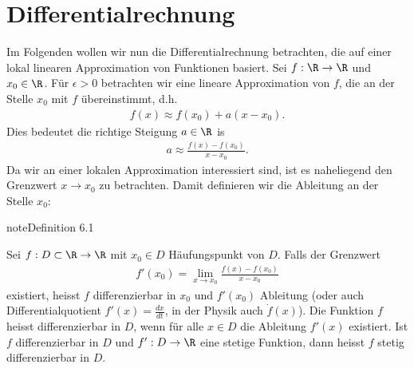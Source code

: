 \documentclass[letterpaper,10pt,english]{jupyterBook}
\begin{document}
\chapter{Differentialrechnung}
\label{\detokenize{differential/differential:differentialrechnung}}\label{\detokenize{differential/differential::doc}}
Im Folgenden wollen wir nun die Differentialrechnung betrachten, die auf einer lokal linearen Approximation von Funktionen basiert. Sei \(f: \R \rightarrow \R\) und \(x_0 \in \R\). Für \(\epsilon > 0\) betrachten wir eine lineare Approximation von \(f\), die an der Stelle \(x_0\) mit \(f\) übereinstimmt, d.h.
\begin{equation*}
\begin{split} f(x) \approx f(x_0) + a (x-x_0).\end{split}
\end{equation*}
Dies bedeutet die richtige Steigung \(a \in \R\) is
\begin{equation*}
\begin{split} a \approx \frac{f(x)-f(x_0)}{x-x_0} .\end{split}
\end{equation*}
Da wir an einer lokalen Approximation interessiert sind, ist es naheliegend den Grenzwert \(x \rightarrow x_0\) zu betrachten. Damit definieren wir die Ableitung an der Stelle \(x_0\):
\label{differential/differential:definition-0}
\begin{sphinxadmonition}{note}{Definition 6.1}



Sei \(f: D \subset \R \rightarrow \R\) mit \(x_0 \in D\) Häufungspunkt von \(D\). Falls der Grenzwert
\begin{equation*}
\begin{split} f'(x_0) = \lim_{x \rightarrow x_0} \frac{f(x) - f(x_0)}{x-x_0}\end{split}
\end{equation*}
existiert, heisst \(f\) differenzierbar in \(x_0\) und \(f'(x_0)\) Ableitung  (oder auch Differentialquotient \(f'(x) = \frac{dx}{dt}\), in der Physik auch \(\dot f(x)\)). Die Funktion \(f\) heisst differenzierbar in \(D\), wenn für alle \(x \in D\) die Ableitung \(f'(x)\) existiert.
Ist \(f\) differenzierbar in \(D\) und \(f':D \rightarrow \R\) eine stetige Funktion, dann heisst \(f\) stetig differenzierbar in \(D\).
\end{sphinxadmonition}
\end{document}
